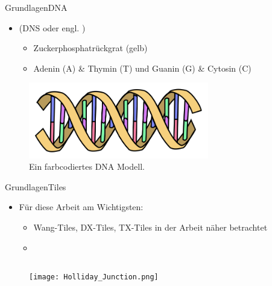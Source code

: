 \documentclass{beamer}
\begin{document}
\begin{frame}[t]{Grundlagen}{DNA}
    \begin{itemize}
        \item \textbf{\color{uzl_oceangreen}{Desoxyribonukleinsäure}} (DNS oder engl. \textbf{\color{uzl_oceangreen}{DNA}})
        \begin{itemize}
            \item Zuckerphosphatrückgrat (gelb)
            \item Adenin (A) \& Thymin (T) und Guanin (G) \& Cytosin (C)
        \end{itemize}
    \end{itemize}
    \begin{figure}
        \centering
        \includegraphics[width=0.7\textwidth]{figures/DNA_Doppelhelix_Farbe.png}
        \caption{Ein farbcodiertes DNA Modell.}
    \end{figure}
\end{frame}

\begin{frame}[t]{Grundlagen}{Tiles}
    \begin{itemize}
        \item Für diese Arbeit am Wichtigsten: \textbf{\color{uzl_oceangreen}{Tiles}}
        \begin{itemize}
            \item Wang-Tiles, DX-Tiles, TX-Tiles in der Arbeit näher betrachtet
            \item \textbf{\color{uzl_oceangreen}{Holliday Junctions}}
        \end{itemize}
    \end{itemize}
    \begin{columns}
        \begin{column}{0.6\textwidth}
            \begin{figure}
                \centering
                \texttt{[image: Holliday\_Junction.png]}
            \end{figure}
        \end{column}
        \begin{column}{0.4\textwidth}
            \begin{figure}
                \centering
            \end{figure}
        \end{column}
    \end{columns}
\end{frame}
\end{document}

